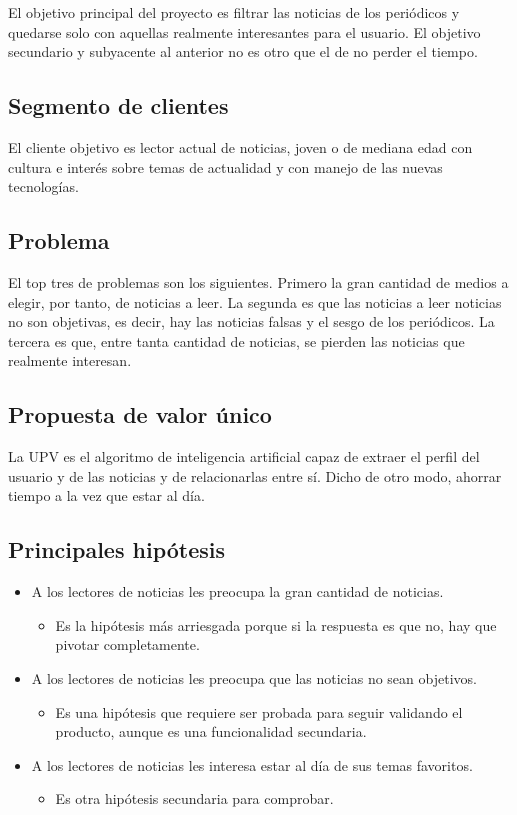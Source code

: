El objetivo principal del proyecto es filtrar las noticias de los periódicos y quedarse solo con aquellas realmente interesantes para el usuario. El objetivo secundario y subyacente al anterior no es otro que el de no perder el tiempo.


\subsection{Segmento de clientes}
El cliente objetivo es lector actual de noticias, joven o de mediana edad con cultura e interés sobre temas de actualidad y con manejo de las nuevas tecnologías. 

\subsection{Problema}
El top tres de problemas son los siguientes. Primero la gran cantidad de medios a elegir, por tanto, de noticias a leer. La segunda es que las noticias a leer noticias no son objetivas, es decir, hay las noticias falsas y el sesgo de los periódicos. La tercera es que, entre tanta cantidad de noticias, se pierden las noticias que realmente interesan.

\subsection{Propuesta de valor único}
La UPV es el algoritmo de inteligencia artificial capaz de extraer el perfil del usuario y de las noticias y de relacionarlas entre sí. Dicho de otro modo, ahorrar tiempo a la vez que estar al día.

\subsection{Principales hipótesis}
\begin{itemize}
    \item A los lectores de noticias les preocupa la gran cantidad de noticias.
    \begin{itemize}
        \item Es la hipótesis más arriesgada porque si la respuesta es que no, hay que pivotar completamente.
    \end{itemize}
    \item A los lectores de noticias les preocupa que las noticias no sean objetivos.
    \begin{itemize}
        \item Es una hipótesis que requiere ser probada para seguir validando el producto, aunque es una funcionalidad secundaria.
    \end{itemize}
    \item A los lectores de noticias les interesa estar al día de sus temas favoritos.
    \begin{itemize}
        \item Es otra hipótesis secundaria para comprobar.
    \end{itemize}
\end{itemize}

